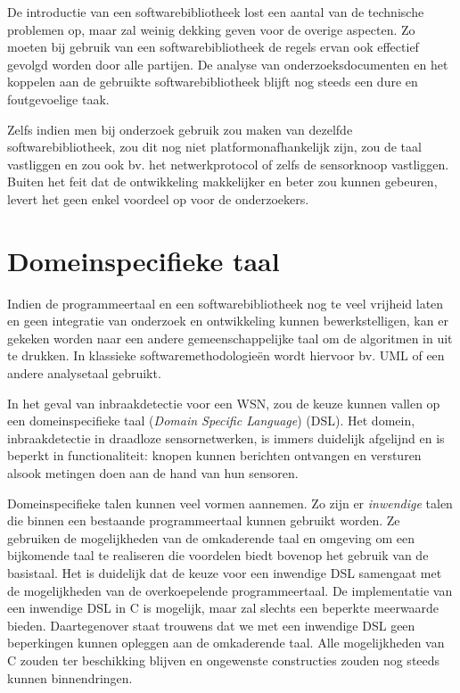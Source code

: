 De introductie van een softwarebibliotheek lost een aantal van de technische
problemen op, maar zal weinig dekking geven voor de overige aspecten. Zo moeten
bij gebruik van een softwarebibliotheek de regels ervan ook effectief gevolgd
worden door alle partijen. De analyse van onderzoeksdocumenten en het koppelen
aan de gebruikte softwarebibliotheek blijft nog steeds een dure en
foutgevoelige taak.

Zelfs indien men bij onderzoek gebruik zou maken van dezelfde
softwarebibliotheek, zou dit nog niet platformonafhankelijk zijn, zou de taal
vastliggen en zou ook bv. het netwerkprotocol of zelfs de sensorknoop
vastliggen. Buiten het feit dat de ontwikkeling makkelijker en beter zou kunnen
gebeuren, levert het geen enkel voordeel op voor de onderzoekers.

\vspace{-3mm}

\section{Domeinspecifieke taal}
\label{section:solution-dsl}

Indien de programmeertaal en een softwarebibliotheek nog te veel vrijheid laten
en geen integratie van onderzoek en ontwikkeling kunnen bewerkstelligen, kan er
gekeken worden naar een andere gemeenschappelijke taal om de algoritmen in uit
te drukken. In klassieke softwaremethodologie\"en wordt hiervoor bv. UML
\citep{url:uml} of een andere analysetaal gebruikt.

In het geval van inbraakdetectie voor een WSN, zou de keuze kunnen vallen op
een domeinspecifieke taal (\emph{Domain Specific Language})
(DSL)\citep{van2000domain, mernik2005and, fowler2010domain}. Het domein,
inbraakdetectie in draadloze sensornetwerken, is immers duidelijk afgelijnd en
is beperkt in functionaliteit: knopen kunnen berichten ontvangen en versturen
alsook metingen doen aan de hand van hun sensoren.

Domeinspecifieke talen kunnen veel vormen aannemen. Zo zijn er \emph{inwendige}
talen die binnen een bestaande programmeertaal kunnen gebruikt worden. Ze
gebruiken de mogelijkheden van de omkaderende taal en omgeving om een
bijkomende taal te realiseren die voordelen biedt bovenop het gebruik van de
basistaal. Het is duidelijk dat de keuze voor een inwendige DSL samengaat met
de mogelijkheden van de overkoepelende programmeertaal. De implementatie van
een inwendige DSL in C is mogelijk, maar zal slechts een beperkte meerwaarde
bieden. Daartegenover staat trouwens dat we met een inwendige DSL geen
beperkingen kunnen opleggen aan de omkaderende taal. Alle mogelijkheden van C
zouden ter beschikking blijven en ongewenste constructies zouden nog steeds
kunnen binnendringen.


